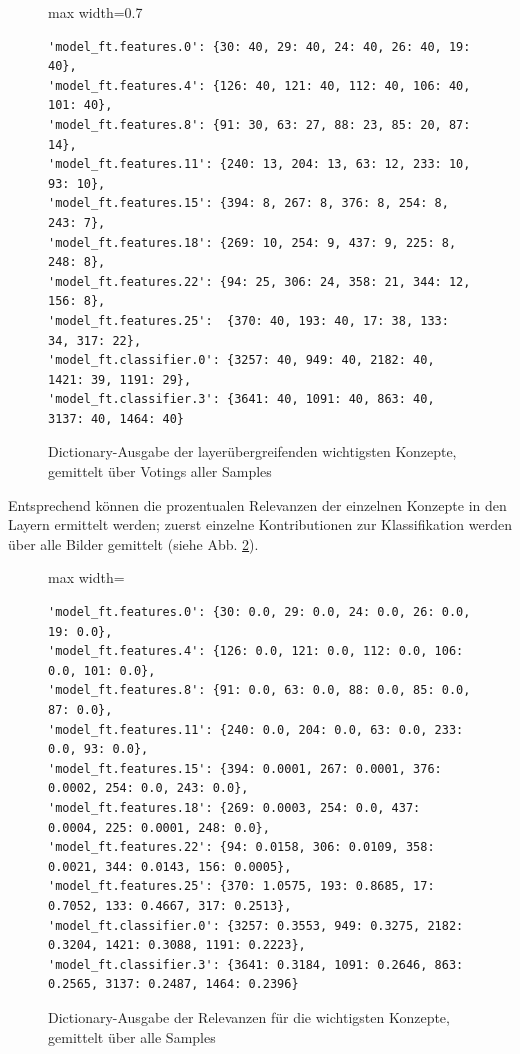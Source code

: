 \begin{figure}[htbp]
\begin{adjustbox}{max width=0.7\linewidth}
\begin{BVerbatim}
'model_ft.features.0': {30: 40, 29: 40, 24: 40, 26: 40, 19: 40},
'model_ft.features.4': {126: 40, 121: 40, 112: 40, 106: 40, 101: 40},
'model_ft.features.8': {91: 30, 63: 27, 88: 23, 85: 20, 87: 14},
'model_ft.features.11': {240: 13, 204: 13, 63: 12, 233: 10, 93: 10},
'model_ft.features.15': {394: 8, 267: 8, 376: 8, 254: 8, 243: 7},
'model_ft.features.18': {269: 10, 254: 9, 437: 9, 225: 8, 248: 8},
'model_ft.features.22': {94: 25, 306: 24, 358: 21, 344: 12, 156: 8},
'model_ft.features.25':  {370: 40, 193: 40, 17: 38, 133: 34, 317: 22},
'model_ft.classifier.0': {3257: 40, 949: 40, 2182: 40, 1421: 39, 1191: 29},
'model_ft.classifier.3': {3641: 40, 1091: 40, 863: 40, 3137: 40, 1464: 40}
\end{BVerbatim}
\end{adjustbox}
    \caption{Dictionary-Ausgabe der layerübergreifenden wichtigsten Konzepte, gemittelt über Votings aller Samples}
    \label{verb:latentoutput}
\end{figure}
\newpage
Entsprechend können die prozentualen Relevanzen der einzelnen Konzepte in den Layern ermittelt werden; zuerst einzelne Kontributionen zur Klassifikation werden über alle Bilder gemittelt (siehe Abb. \ref{verb:latentoutput2}).
\begin{figure}[htbp]
\begin{adjustbox}{max width=\linewidth}
\begin{BVerbatim}
'model_ft.features.0': {30: 0.0, 29: 0.0, 24: 0.0, 26: 0.0, 19: 0.0}, 
'model_ft.features.4': {126: 0.0, 121: 0.0, 112: 0.0, 106: 0.0, 101: 0.0}, 
'model_ft.features.8': {91: 0.0, 63: 0.0, 88: 0.0, 85: 0.0, 87: 0.0}, 
'model_ft.features.11': {240: 0.0, 204: 0.0, 63: 0.0, 233: 0.0, 93: 0.0}, 
'model_ft.features.15': {394: 0.0001, 267: 0.0001, 376: 0.0002, 254: 0.0, 243: 0.0},
'model_ft.features.18': {269: 0.0003, 254: 0.0, 437: 0.0004, 225: 0.0001, 248: 0.0}, 
'model_ft.features.22': {94: 0.0158, 306: 0.0109, 358: 0.0021, 344: 0.0143, 156: 0.0005}, 
'model_ft.features.25': {370: 1.0575, 193: 0.8685, 17: 0.7052, 133: 0.4667, 317: 0.2513}, 
'model_ft.classifier.0': {3257: 0.3553, 949: 0.3275, 2182: 0.3204, 1421: 0.3088, 1191: 0.2223}, 
'model_ft.classifier.3': {3641: 0.3184, 1091: 0.2646, 863: 0.2565, 3137: 0.2487, 1464: 0.2396}
\end{BVerbatim}
\end{adjustbox}\caption{Dictionary-Ausgabe der Relevanzen für die wichtigsten Konzepte, gemittelt über alle Samples}
    \label{verb:latentoutput2}
\end{figure}
